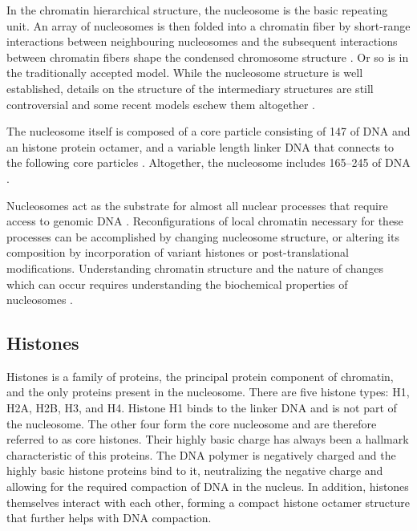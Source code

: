   In the chromatin hierarchical structure, the nucleosome is the
  basic repeating unit.
  An array of nucleosomes is then folded into a chromatin fiber by
  short-range interactions between neighbouring nucleosomes
  and the subsequent interactions between chromatin fibers shape the
  condensed chromosome structure .
  Or so is in the traditionally accepted model.  While the nucleosome
  structure is well established, details on the structure of the
  intermediary structures are still controversial and some recent models
  eschew them altogether
  \citep{fussner2011-no-30nm-fibre, luger2012-chromatin-review}.

  The nucleosome itself is composed of a core particle
  consisting of \SI{147}{\bp} of DNA and an histone protein octamer,
  and a variable length linker DNA that connects
  to the following core particles .
  Altogether, the nucleosome includes \SIrange{165}{245}{\bp} of DNA
  \citep{widom1992-linker-length}.

  Nucleosomes act as the substrate for almost all nuclear processes that
  require access to genomic DNA \citep{controlling-double-helix}.
  Reconfigurations of local chromatin necessary for these processes can
  be accomplished by changing nucleosome structure, or altering its
  composition by incorporation of variant histones or post-translational
  modifications.
  Understanding chromatin structure and the nature of changes which can
  occur requires understanding the biochemical properties of nucleosomes
  .

  \subsection{Histones}

    Histones is a family of proteins, the principal protein component
    of chromatin, and the only proteins present in the nucleosome.
    There are five histone types: H1, H2A, H2B, H3, and H4.
    Histone H1 binds to the linker DNA and is not part of the nucleosome.
    The other four form the core
    nucleosome and are therefore referred to as core histones.
    Their highly basic charge has always been a hallmark characteristic of
    this proteins.  The DNA polymer is negatively charged and the highly
    basic histone proteins bind to it, neutralizing the negative charge
    and allowing for the required compaction of DNA in the nucleus.
    In addition, histones themselves interact with each other, forming
    a compact histone octamer structure that further helps with
    DNA compaction.

